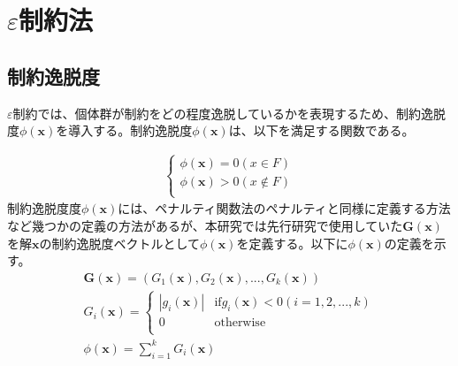 \documentclass[a4paper,12pt]{jsreport}
\begin{document}


\newpage


\section{$\varepsilon$制約法}
\subsection{制約逸脱度}
$\varepsilon$制約では、個体群が制約をどの程度逸脱しているかを表現するため、制約逸脱度$\phi(\bm x)$を導入する。制約逸脱度$\phi(\bm x)$は、以下を満足する関数である。

\begin{eqnarray}
\left\{
\begin{array}{cc}
    \phi(\bm x)=0(x\in{F})\\
    \phi(\bm x)>0(x\notin{F})\\
\end{array}
\right.
\end{eqnarray}
制約逸脱度度$\phi(\bm x)$には、ペナルティ関数法のペナルティと同様に定義する方法など幾つかの定義の方法があるが、本研究では先行研究で使用していた$\bm{G}(\bm{x})$を解$\bm x$の制約逸脱度ベクトルとして$\phi(\bm x)$を定義する。以下に$\phi(\bm x)$の定義を示す。
\begin{eqnarray}
\bm{G(x)}=({G}_1(\bm{x}),{G}_2(\bm{x}),...,{G}_k(\bm{x}))\\   
{G}_i(\bm{x})=
\left\{
\begin{array}{cc}
     |{g}_i(\bm{x})| & \mbox{if${g}_i(\bm{x})<0(i=1,2,...,k)$} \\
    {0} & \mbox{otherwise}\\
\end{array}
\right.\\
{\phi(\bm{x})}=\sum_{i=1}^k {G}_i(\bm{x})
\end{eqnarray}
\end{document}
